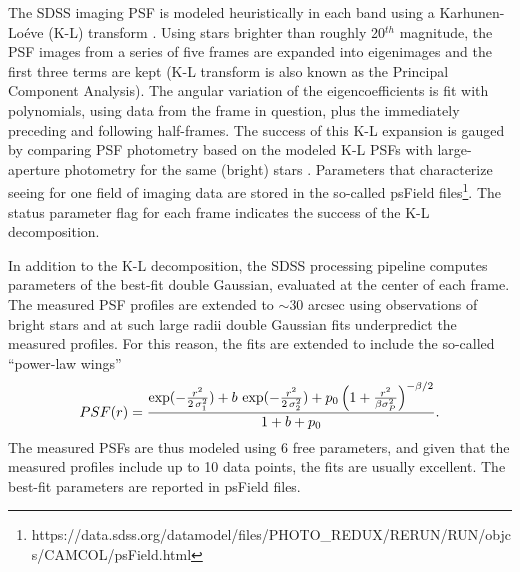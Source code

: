 The SDSS imaging PSF is modeled 
heuristically in each band using a Karhunen-Lo\'{e}ve (K-L) transform \citep{Lupton2002}. 
Using stars brighter than roughly 20$^{th}$ magnitude, the PSF images from a series of five 
frames are expanded into eigenimages and the first three terms are kept (K-L transform is 
also known as the Principal Component Analysis). The angular variation of the eigencoefficients
is fit with polynomials, using data from the frame in question, plus the immediately preceding 
and following half-frames. The success of this K-L expansion is gauged by comparing PSF 
photometry based on the modeled K-L PSFs with large-aperture photometry for the same 
(bright) stars \citep{SDSSEDR}. 
Parameters that characterize seeing for one field of imaging data are stored in the so-called psField 
files\footnote{https://data.sdss.org/datamodel/files/PHOTO\_REDUX/RERUN/RUN/objcs/CAMCOL/psField.html}. 
The status parameter flag for each frame indicates the success of the K-L decomposition.

In addition to the K-L decomposition, the SDSS processing pipeline computes parameters of the 
best-fit double Gaussian, evaluated at the center of each frame. The measured PSF profiles are 
extended to $\sim$30 arcsec using observations of bright stars and at such large radii 
double Gaussian fits underpredict the measured profiles. For this reason, the fits are extended 
to include the so-called ``power-law wings''
\begin{equation}
\label{eq:SDSSPSF}
        PSF(r) = {\exp(-{r^2\over 2\,\sigma_1^2}) + b\,\exp(-{r^2\over 2\,\sigma_2^2})
           + p_0\left(1 + { r^2 \over \beta \sigma_P^2}\right)^{-\beta/2} \over 1 + b + p_0}.
\end{equation} 
The measured PSFs are thus modeled using 6 free parameters, and given that the measured
profiles include up to 10 data points, the fits are usually excellent. The best-fit parameters
are reported in psField files. 

